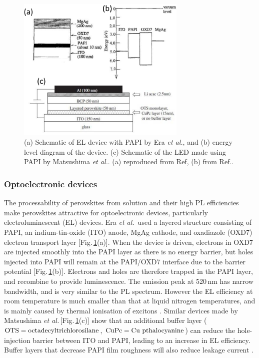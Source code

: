 \begin{figure}[h!]
\centering
\includegraphics[width=0.72\textwidth]{Fig22}
\caption{(a) Schematic of EL device with PAPI by Era \textit{et al.}, and (b) energy level diagram of the device. (c) Schematic of the LED made using PAPI by Matsushima \textit{et al.}. (a) reproduced from Ref\!, (b) from Ref.\!.}
\label{2Fig22}
\end{figure}
\subsubsection{Optoelectronic devices}
The processability of perovskites from solution and their high PL efficiencies make perovskites attractive for optoelectronic devices, particularly electroluminescent (EL) devices. Era \textit{et al.}\ used a layered structure consisting of PAPI, an indium-tin-oxide (ITO) anode, MgAg cathode, and oxadiazole (OXD7) electron transport layer [Fig.\,\ref{2Fig22}(a)]. When the device is driven, electrons in OXD7 are injected smoothly into the PAPI layer as there is no energy barrier, but holes injected into PAPI will remain at the PAPI/OXD7 interface due to the barrier potential [Fig.\,\ref{2Fig22}(b)]. Electrons and holes are therefore trapped in the PAPI layer, and recombine to provide luminescence. The emission peak at 520\,nm has narrow bandwidth, and is very similar to the PL spectrum. However the EL efficiency at room temperature is much smaller than that at liquid nitrogen temperatures, and is mainly caused by thermal ionisation of excitons \cite{Era1994}. Similar devices made by Matsushima \textit{et al.\,}[Fig.\,\ref{2Fig22}(c)] show that an additional buffer layer ($\textnormal{OTS}=\textnormal{octadecyltrichlorosilane}$, $\textnormal{CuPc}=\textnormal{Cu pthalocyanine}$) can reduce the hole-injection barrier between ITO and PAPI, leading to an increase in EL efficiency. Buffer layers that decrease PAPI film roughness will also reduce leakage current \cite{Matsushima2005}.

